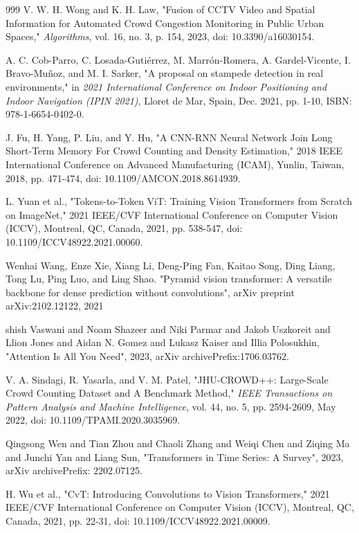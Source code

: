 \documentclass[11pt]{report}
\begin{document}
\begin{thebibliography}{999}
    V. W. H. Wong and K. H. Law, "Fusion of CCTV Video and Spatial Information for Automated Crowd Congestion Monitoring in Public Urban Spaces," \textit{Algorithms}, vol. 16, no. 3, p. 154, 2023, doi: 10.3390/a16030154.
    
    A. C. Cob-Parro, C. Losada-Gutiérrez, M. Marrón-Romera, A. Gardel-Vicente, I. Bravo-Muñoz, and M. I. Sarker, "A proposal on stampede detection in real environments," in \textit{2021 International Conference on Indoor Positioning and Indoor Navigation (IPIN 2021)}, Lloret de Mar, Spain, Dec. 2021, pp. 1-10, ISBN: 978-1-6654-0402-0.

    
    J. Fu, H. Yang, P. Liu, and Y. Hu, "A CNN-RNN Neural Network Join Long Short-Term Memory For Crowd Counting and Density Estimation," 2018 IEEE International Conference on Advanced Manufacturing (ICAM), Yunlin, Taiwan, 2018, pp. 471-474, doi: 10.1109/AMCON.2018.8614939.

    L. Yuan et al., "Tokens-to-Token ViT: Training Vision Transformers from Scratch on ImageNet," 2021 IEEE/CVF International Conference on Computer Vision (ICCV), Montreal, QC, Canada, 2021, pp. 538-547, doi: 10.1109/ICCV48922.2021.00060. 

    Wenhai Wang, Enze Xie, Xiang Li, Deng-Ping Fan, Kaitao Song, Ding Liang, Tong Lu, Ping Luo, and Ling Shao. "Pyramid vision transformer: A versatile backbone for dense prediction without convolutions", arXiv preprint arXiv:2102.12122, 2021

      shish Vaswani and Noam Shazeer and Niki Parmar and Jakob Uszkoreit and Llion Jones and Aidan N. Gomez and Lukasz Kaiser and Illia Polosukhin, "Attention Is All You Need", 2023, arXiv archivePrefix:1706.03762.
    
    V. A. Sindagi, R. Yasarla, and V. M. Patel, "JHU-CROWD++: Large-Scale Crowd Counting Dataset and A Benchmark Method," \textit{IEEE Transactions on Pattern Analysis and Machine Intelligence}, vol. 44, no. 5, pp. 2594-2609, May 2022, doi: 10.1109/TPAMI.2020.3035969.

      Qingsong Wen and Tian Zhou and Chaoli Zhang and Weiqi Chen and Ziqing Ma and Junchi Yan and Liang Sun, "Transformers in Time Series: A Survey", 2023, arXiv archivePrefix: 2202.07125.

    H. Wu et al., "CvT: Introducing Convolutions to Vision Transformers," 2021 IEEE/CVF International Conference on Computer Vision (ICCV), Montreal, QC, Canada, 2021, pp. 22-31, doi: 10.1109/ICCV48922.2021.00009. 
    

\end{thebibliography}
\end{document}
